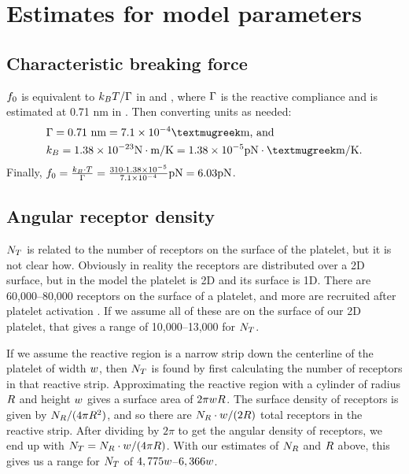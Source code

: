\documentclass{article}
\begin{document}
\section{Estimates for model parameters}
\label{sec:estim-model-param}

\subsection{Characteristic breaking force}
\label{sec:char-break-force}

$f_0$ is equivalent to $k_BT/\Gamma$ in
\cite{Pospieszalska2009} and \cite{Sundd2011}, where $\Gamma$ is
the reactive compliance and is estimated at 0.71 nm in
\cite{Mody2008b}. Then converting units as needed:
\begin{align*}
  &\compliance = 0.71 \text{ nm} = 7.1 \times 10^{-4}
    \text{{\textmugreek}m} \text{, and} \\
  &\boltzmann = 1.38 \times 10^{-23} \text{N}\cdot\text{m}/\text{K} =
    1.38 \times 10^{-5} \text{pN}\cdot\text{{\textmugreek}m}/\text{K}.
\end{align*}
Finally, $f_0 = \frac{k_B\cdot T}{\Gamma} =
\frac{310 \cdot 1.38 \times 10^{-5}}{7.1 \times 10^{-4}} \text{pN} = 6.03
\text{pN}$.

\subsection{Angular receptor density}
\label{sec:ang-rec-dens}

$N_T$ is related to the number of receptors on the
surface of the platelet, but it is not clear how. Obviously in reality
the receptors are distributed over a 2D surface, but in the model the
platelet is 2D and its surface is 1D. There are 60,000--80,000 
  receptors on the surface of a platelet, and more are
recruited after platelet activation
\cite{Shattil1998,Litvinov2011}. If we assume all of these are on the
surface of our 2D platelet, that gives a range of 10,000--13,000 for
$N_T$. 

If we assume the reactive region is a narrow strip down the centerline
of the platelet of width $w$, then $N_T$ is found by
first calculating the number of receptors in that reactive
strip. Approximating the reactive region with a cylinder of radius
$R$ and height $w$ gives a surface area of
$2\pi wR$. The surface density of receptors is given by
$N_R/(4\pi R^2)$, and so there are
$N_R\cdot w/(2R)$ total receptors in the
reactive strip. After dividing by $2\pi$ to get the angular density of
receptors, we end up with $N_T =
N_R\cdot w/(4\pi R)$. With our estimates of
$N_R$ and $R$ above, this gives us a range for
$N_T$ of $4,775w$--$6,366w$.
\end{document}
